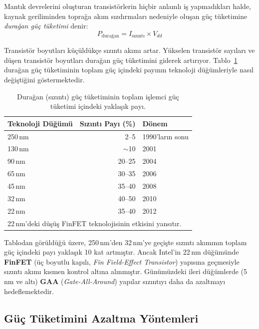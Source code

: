 Mantık devrelerini oluşturan transistörlerin hiçbir anlamlı iş yapmadıkları halde, kaynak geriliminden toprağa akım sızdırmaları nedeniyle oluşan güç tüketimine \emph{durağan güç tüketimi} denir:
\begin{equation}
P_{\text{durağan}} = I_{\text{sızıntı}} \times V_{dd}
\label{eq:duragan-guc}
\end{equation}

Transistör boyutları küçüldükçe sızıntı akımı artar. Yükselen transistör sayıları ve düşen transistör boyutları durağan güç tüketimini giderek artırıyor. Tablo~\ref{tab:sizinti-trend} durağan güç tüketiminin toplam güç içindeki payının teknoloji düğümleriyle nasıl değiştiğini göstermektedir.

\begin{table}[ht!]
\centering
\caption[Durağan güç oranının teknoloji düğümlerine göre değişimi]{Durağan (sızıntı) güç tüketiminin toplam işlemci güç tüketimi içindeki yaklaşık payı.}
\label{tab:sizinti-trend}
\footnotesize
\begin{tabular}{lrl}
\toprule
\textbf{Teknoloji Düğümü} & \textbf{Sızıntı Payı (\%)} & \textbf{Dönem} \\
\midrule
250\,nm  & 2--5    & 1990'ların sonu \\
130\,nm  & ${\sim}$10   & 2001 \\
90\,nm   & 20--25  & 2004 \\
65\,nm   & 30--35  & 2006 \\
45\,nm   & 35--40  & 2008 \\
32\,nm   & 40--50  & 2010 \\
22\,nm   & 35--40  & 2012 \\
\bottomrule
\multicolumn{3}{l}{\scriptsize 22\,nm'deki düşüş FinFET teknolojisinin etkisini yansıtır.}
\end{tabular}
\end{table}

Tablodan görüldüğü üzere, 250\,nm'den 32\,nm'ye geçişte sızıntı akımının toplam güç içindeki payı yaklaşık 10 kat artmıştır. Ancak Intel'in 22\,nm düğümünde \textbf{FinFET} (üç boyutlu kapılı, \emph{Fin Field-Effect Transistor}) yapısına geçmesiyle sızıntı akımı kısmen kontrol altına alınmıştır. Günümüzdeki ileri düğümlerde (5\,nm ve altı) \textbf{GAA} (\emph{Gate-All-Around}) yapılar sızıntıyı daha da azaltmayı hedeflemektedir.


\subsection{Güç Tüketimini Azaltma Yöntemleri}
\label{sec:guc-azaltma}

